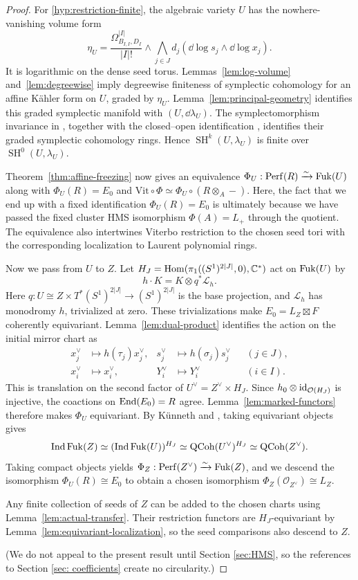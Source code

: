 \documentclass[12pt, letter]{amsart}
\theoremstyle{definition}
\newcommand{\OO}{\mathcal O}
\newcommand{\SH}{\operatorname{SH}}
\DeclareMathOperator{\Ind}{Ind}
\numberwithin{equation}{section}
\begin{document}
\begin{proof}
For \ref{hyp:restriction-finite}, the algebraic variety $U$ has
the nowhere-vanishing volume form
\[
 \eta_U=
 \frac{\Omega_{B_{I,I},D_I}^{|I|}}{|I|!}
 \wedge\bigwedge_{j\in J}
       d_j(\dd\log s_j\wedge\dd\log x_j).
\]
It is logarithmic on the dense seed torus.
Lemmas~\ref{lem:log-volume} and~\ref{lem:degreewise} imply
degreewise finiteness of symplectic cohomology for an affine
K\"ahler form on $U$, graded by $\eta_U$.
Lemma~\ref{lem:principal-geometry} identifies this graded symplectic
manifold with $(U,\dd\lambda_U)$.
The symplectomorphism invariance in \cite[Theorem~1.1]{HSinv},
together with the closed--open identification
\cite[Theorem~1.1]{Ganatra}, identifies their graded symplectic
cohomology rings. Hence
$
 \SH^k(U,\lambda_U)$ is finite over $
 \SH^0(U,\lambda_U)$.

Theorem~\ref{thm:affine-freezing} now gives an equivalence
$\Phi_U:\mathrm{Perf}(R)\xrightarrow{\sim}\operatorname{Fuk}(U)$ along with
$\Phi_U(R)=E_0$ and $\mathrm{Vit}\circ\Phi\simeq\Phi_U\circ(R\otimes_A-).$
Here, the fact that we end up with a fixed identification $\Phi_U(R)=E_0$ is ultimately because we have passed the fixed cluster HMS isomorphism $\Phi(A) = L_+$ through the quotient.
The equivalence also intertwines Viterbo restriction to the chosen seed tori with the corresponding localization to Laurent polynomial rings.  


Now we pass from \(U\) to \(Z\). 
Let $H_J=\operatorname{Hom}(\pi_1((S^1)^{2|J|},0),\mathbb C^*)$ act on $\operatorname{Fuk}(U)$ by
\[
 h\cdot K=K\otimes q^*\mathcal L_h.
\]
Here $q:U\cong Z\times T^*(S^1)^{2|J|}\to(S^1)^{2|J|}$
is the base projection, and $\mathcal L_h$ has monodromy $h$,
trivialized at zero. These trivializations make $E_0=L_Z\boxtimes F$
coherently equivariant.
Lemma~\ref{lem:dual-product} identifies the action on the initial mirror chart as
\[
 \begin{aligned}
 x_j^\vee&\longmapsto h(\tau_j)x_j^\vee,&
 s_j^\vee&\longmapsto h(\sigma_j)s_j^\vee &&(j\in J),\\
 x_i^\vee&\longmapsto x_i^\vee,&
 Y_i^\vee&\longmapsto Y_i^\vee &&(i\in I).
 \end{aligned}
\]
This is translation on the second factor of $U^\vee=Z^\vee\times H_J$.
Since $h_0\otimes\id_{\OO(H_J)}$ is injective, the coactions on
$\operatorname{End}(E_0)=R$ agree.
Lemma~\ref{lem:marked-functors} therefore makes $\Phi_U$ equivariant.
By K\"unneth and \cite[Lemma~9]{ShendeToric}, taking equivariant objects gives
\[
 \Ind\Fuk(Z)
 \simeq(\Ind\Fuk(U))^{H_J}
 \simeq\QCoh(U^\vee)^{H_J}
 \simeq\QCoh(Z^\vee).
\]
Taking compact objects yields
$\Phi_Z:\mathrm{Perf}(Z^\vee) \xrightarrow{\sim} \operatorname{Fuk}(Z)  $, and we descend the  isomorphism 
$\Phi_U(R) \cong E_0$ to
obtain a chosen isomorphism $\Phi_Z(\OO_{Z^\vee}) \cong L_Z$.



Any finite collection of seeds of $Z$ can be added to the chosen charts
using Lemma~\ref{lem:actual-transfer}.
Their restriction functors are $H_J$-equivariant by
Lemma~\ref{lem:equivariant-localization}, so the seed comparisons
also descend to $Z$.

(We do not appeal to the present result until Section \ref{sec:HMS}, so the references to Section \ref{sec: coefficients} create no circularity.) 
\end{proof}
\end{document}
